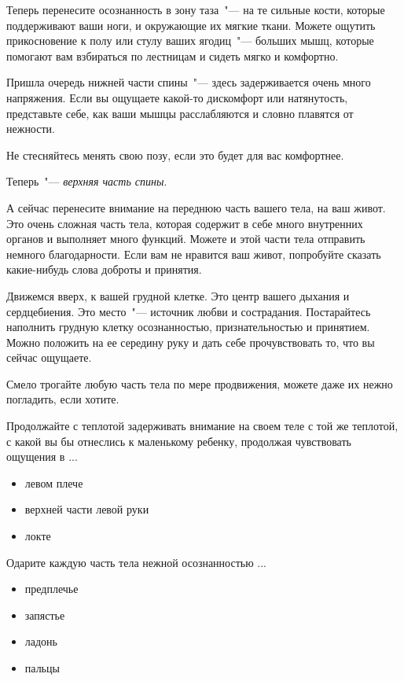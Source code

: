 \begin{itemize}
	\itemdiamondsuit Теперь перенесите осознанность в зону таза~"--- на те сильные кости, которые поддерживают ваши ноги, и окружающие их мягкие ткани. Можете ощутить прикосновение к полу или стулу ваших ягодиц~"--- больших мышц, которые помогают вам взбираться по лестницам и сидеть мягко и комфортно.
	
	\itemdiamondsuit Пришла очередь нижней части спины~"--- здесь задерживается очень много напряжения. Если вы ощущаете какой-то дискомфорт или натянутость, представьте себе, как ваши мышцы расслабляются и словно плавятся от нежности.
	
	\itemdiamondsuit Не стесняйтесь менять свою позу, если это будет для вас комфортнее.
	
	\itemdiamondsuit Теперь~"--- \emph{верхняя часть спины}.
	
	\itemdiamondsuit А сейчас перенесите внимание на переднюю часть вашего тела, на ваш живот. Это очень сложная часть тела, которая содержит в себе много внутренних органов и выполняет много функций. Можете и этой части тела отправить немного благодарности. Если вам не нравится ваш живот, попробуйте сказать какие-нибудь слова доброты и принятия.
	
	\itemdiamondsuit Движемся вверх, к вашей грудной клетке. Это центр вашего дыхания и сердцебиения. Это место~"--- источник любви и сострадания. Постарайтесь наполнить грудную клетку осознанностью, признательностью и принятием. Можно положить на ее середину руку и дать себе прочувствовать то, что вы сейчас ощущаете.
	
	\itemdiamondsuit Смело трогайте любую часть тела по мере продвижения, можете даже их нежно погладить, если хотите.
	
	\itemdiamondsuit Продолжайте с теплотой задерживать внимание на своем теле с той же теплотой, с какой вы бы отнеслись к маленькому ребенку, продолжая чувствовать ощущения в ...
	\begin{itemize}
		\item левом плече
		\item верхней части левой руки
		\item локте
	\end{itemize}
	
	\itemdiamondsuit Одарите каждую часть тела нежной осознанностью ...
	\begin{itemize}
		\item предплечье
		\item запястье
		\item ладонь
		\item пальцы	
	\end{itemize}
	

\end{itemize}

